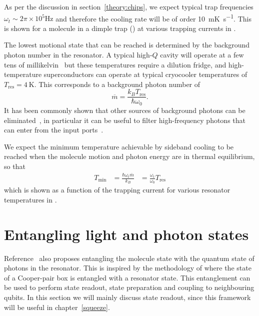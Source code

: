 As per the discussion in section~\ref{theory:chips}, we expect typical trap
frequencies $\omega_t\sim 2\pi \times 10^5 \si{\hertz}$ and therefore the
cooling rate will be of order \SI{10}{\milli\kelvin\per\second}. This is shown
for a molecule in a dimple trap () at various trapping currents in
.

The lowest motional state that can be reached is determined by the background
photon number in the resonator. A typical high-$Q$ cavity will operate at a few
tens of millikelvin~\cite{doi:10.1063/1.3010859} but these temperatures require
a dilution fridge, and high-temperature superconductors can operate at typical
cryocooler temperatures of $T_\text{res}=\SI{4}{\kelvin}$. This corresponds
to a background photon number of
%
\begin{equation}
  \overline{m} = \frac{k_B T_\text{res}}{\hbar \omega_0}.
\end{equation}
%
It has been commonly shown that other sources of background photons can be
eliminated~\cite{Wallraff2004}, in particular it can be useful to filter
high-frequency photons that can enter from the input
ports~\cite{doi:10.1063/1.3638063}. 

We expect the minimum temperature achievable by sideband cooling to be reached
when the molecule motion and photon energy are in thermal equilibrium, so that
%
\begin{align}
  T_\text{min} &= \frac{\hbar \omega_t \overline{m}}{k_B}
               &= \frac{\omega_t}{\omega_0}T_\text{res}
\end{align}
%
which is shown as a function of the trapping current for various resonator
temperatures in .

\section{Entangling light and photon states}

Reference~\cite{Andre2006} also proposes entangling the molecule state with the
quantum state of photons in the resonator. This is inspired by the methodology
of  where the state of a Cooper-pair box is
entangled with a resonator state. This entanglement can be used to perform
state readout, state preparation and coupling to neighbouring qubits. In this
section we will mainly discuss state readout, since this framework will be
useful in chapter~\ref{squeeze}.

